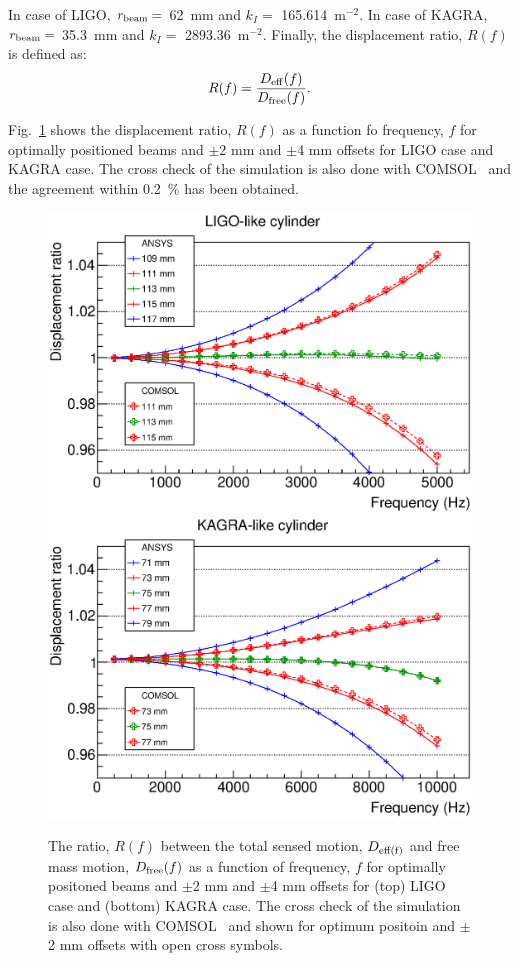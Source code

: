 In case of LIGO, $r_{\rm beam}=$ 62~mm and $k_{I}=$ 165.614~m$^{-2}$.
In case of KAGRA, $r_{\rm beam}=$ 35.3~mm and $k_{I}=$ 2893.36~m$^{-2}$.
Finally, the displacement ratio, $R(f)$ is defined as:
\begin{equation}
R(f) = \frac{D_{\rm eff}(f)}{D_{\rm free}(f)}.
\end{equation}

Fig.~\ref{fig:fem-optc} shows the displacement ratio, $R(f)$ 
as a function fo frequency, $f$ for optimally positioned beams and 
$\pm$2 mm and $\pm$4 mm offsets for LIGO case and KAGRA case. 
The cross check of the simulation is also done with COMSOL~\cite{COMSOL} 
and the agreement within 0.2~\% has been obtained.

\begin{figure}
\begin{center}
\includegraphics[width=12cm]{Figures/fem-lgc-opt.eps}
\includegraphics[width=12cm]{Figures/fem-kgc-opt.eps}
\caption{The ratio, $R(f)$ between the total sensed motion, 
$D_{\rm eff(f)}$ and free mass motion, $D_{\rm free}(f)$ 
as a function of frequency, $f$ for optimally positoned beams and 
$\pm$2 mm and $\pm$4 mm offsets for (top) LIGO case and 
(bottom) KAGRA case. The cross check of the simulation is also done 
with COMSOL~\cite{COMSOL} and shown for optimum positoin and $\pm$2 mm 
offsets with open cross symbols.} 
\label{fig:fem-optc} 
\end{center}
\end{figure}


